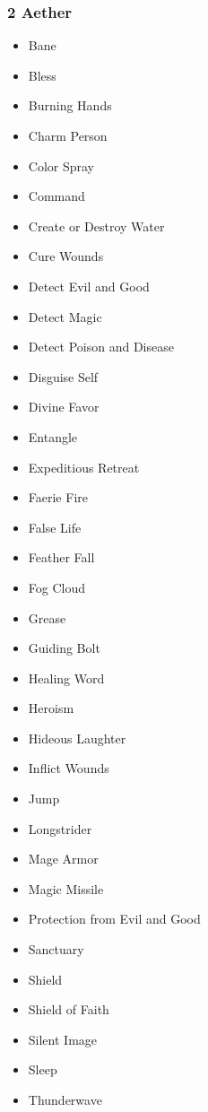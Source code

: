 \subsubsection{2 Aether}
\begin{itemize}
\item Bane
\item Bless
\item Burning Hands
\item Charm Person
\item Color Spray
\item Command
\item Create or Destroy Water
\item Cure Wounds
\item Detect Evil and Good
\item Detect Magic
\item Detect Poison and Disease
\item Disguise Self
\item Divine Favor
\item Entangle
\item Expeditious Retreat
\item Faerie Fire
\item False Life
\item Feather Fall
\item Fog Cloud
\item Grease
\item Guiding Bolt
\item Healing Word
\item Heroism
\item Hideous Laughter
\item Inflict Wounds
\item Jump
\item Longstrider
\item Mage Armor
\item Magic Missile
\item Protection from Evil and Good
\item Sanctuary
\item Shield
\item Shield of Faith
\item Silent Image
\item Sleep
\item Thunderwave
\end{itemize}

